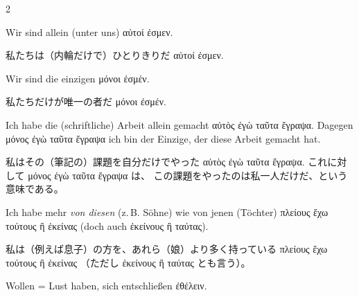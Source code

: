 \begin{paracol}{2}
\begin{enumerate}[leftmargin=0pt,rightmargin=0pt,listparindent =1cm,labelindent=1cm,labelsep=1ex,labelwidth={*},itemindent={*},align=left]
\begin{continuousitemline}
\begin{german}
Wir sind allein (unter uns) \textgreek[variant=ancient]{αὐτοί ἐσμεν.}
\end{german}
\switchcolumn

\begin{japanese}
私たちは（内輪だけで）ひとりきりだ \textgreek[variant=ancient]{αὐτοί ἐσμεν.}
\end{japanese}
\switchcolumn*

\begin{german}
Wir sind die einzigen \textgreek[variant=ancient]{μόνοι ἐσμέν.}
\end{german}
\switchcolumn

\begin{japanese}
私たちだけが唯一の者だ \textgreek[variant=ancient]{μόνοι ἐσμέν.}
\end{japanese}
\switchcolumn*
\end{continuousitemline}

\begin{german}
Ich habe die (schriftliche) Arbeit allein gemacht \textgreek[variant=ancient]{αὐτὸς
ἐγὼ ταῦτα ἔγραψα.} Dagegen \textgreek[variant=ancient]{μόνος ἐγὼ ταῦτα
ἔγραψα} ich bin der Einzige, der diese Arbeit gemacht hat.
\end{german}
\switchcolumn

\begin{japanese}
私はその（筆記の）課題を自分だけでやった
\textgreek[variant=ancient]{αὐτὸς ἐγὼ ταῦτα ἔγραψα.}
これに対して \textgreek[variant=ancient]{μόνος ἐγὼ ταῦτα ἔγραψα} は、
この課題をやったのは私一人だけだ、という意味である。
\end{japanese}
\switchcolumn*

\begin{german}
\item Ich habe mehr \emph{von diesen} (z.\,B. Söhne) wie von jenen (Töchter)
\textgreek[variant=ancient]{πλείους ἔχω τούτους ἢ ἐκείνας} (doch auch
\textgreek[variant=ancient]{ἐκείνους ἢ ταύτας}).
\end{german}
\switchcolumn

\begin{japanese}
私は（例えば息子）の方を、あれら（娘）より多く持っている
\textgreek[variant=ancient]{πλείους ἔχω τούτους ἢ ἐκείνας}
（ただし \textgreek[variant=ancient]{ἐκείνους ἢ ταύτας} とも言う）。
\end{japanese}
\switchcolumn*

\begin{german}
\item Wollen = Lust haben, sich entschließen \textgreek[variant=ancient]{ἐθέλειν.}
\end{german}
\switchcolumn


\end{enumerate}
\end{paracol}
